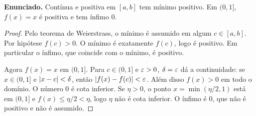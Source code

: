 \documentclass[11pt,a4paper]{article}
\begin{document}
\textbf{Enunciado.} Cont\'inua e positiva em $[a,b]$ tem m\'inimo positivo. Em $(0,1]$, $f(x)=x$ \'e positiva e tem \'infimo $0$.

\begin{proof}
Pelo teorema de Weierstrass, o m\'inimo \'e assumido em algum $c\in[a,b]$. Por hip\'otese $f(c)>0$. O m\'inimo \'e exatamente $f(c)$, logo \'e positivo. Em particular o \'infimo, que coincide com o m\'inimo, \'e positivo.

Agora $f(x)=x$ em $(0,1]$. Para $c\in(0,1]$ e $\varepsilon>0$, $\delta=\varepsilon$ d\'a a continuidade: se $x\in(0,1]$ e $\left\lvert x-c \right\rvert<\delta$, ent\~ao $\left\lvert f(x)-f(c) \right\rvert<\varepsilon$. Al\'em disso $f(x)>0$ em todo o dom\'inio. O n\'umero $0$ \'e cota inferior. Se $\eta>0$, o ponto $x=\min(\eta/2,1)$ est\'a em $(0,1]$ e $f(x)\le \eta/2<\eta$, logo $\eta$ n\~ao \'e cota inferior. O \'infimo \'e $0$, que n\~ao \'e positivo e n\~ao \'e assumido.
\end{proof}
\end{document}
